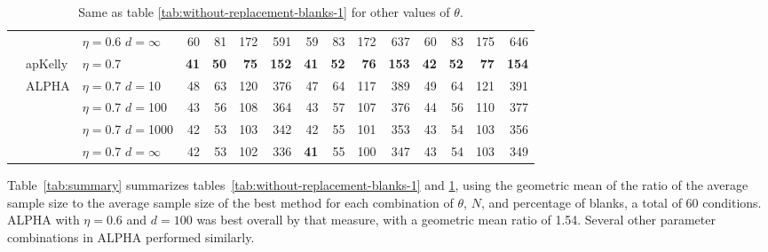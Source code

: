 \documentclass[12pt,runningheads]{llncs}
\begin{document}
{\begin{table}
\begin{tabular}{lll|rrrr|rrrr|rrrr}
 &  & $\eta=$0.6 $d=\infty$ & 60  & 81  & 172  & 591  & 59  & 83  & 172  & 637  & 60  & 83  & 175  & 646  \\
\cline{2-15} & apKelly & $\eta=$0.7 & \bf{41}  & \bf{50}  & \bf{75}  & \bf{152}  & \bf{41}  & \bf{52}  & \bf{76}  & \bf{153}  & \bf{42}  & \bf{52}  & \bf{77}  & \bf{154}  \\
\cline{2-15}
& ALPHA & $\eta=$0.7 $d=$10 & 48  & 63  & 120  & 376  & 47  & 64  & 117  & 389  & 49  & 64  & 121  & 391  \\
&  & $\eta=$0.7 $d=$100 & 43  & 56  & 108  & 364  & 43  & 57  & 107  & 376  & 44  & 56  & 110  & 377  \\
&  & $\eta=$0.7 $d=$1000 & 42  & 53  & 103  & 342  & 42  & 55  & 101  & 353  & 43  & 54  & 103  & 356  \\
&  & $\eta=$0.7 $d=\infty$ & 42  & 53  & 102  & 336  & \bf{41}  & 55  & 100  & 347  & 43  & 54  & 103  & 349 
 \end{tabular}
\caption{\protect \label{tab:without-replacement-blanks-2}
Same as table \ref{tab:without-replacement-blanks-1} for other values of $\theta$.
}
\end{table}

Table~\ref{tab:summary} summarizes tables~\ref{tab:without-replacement-blanks-1} and \ref{tab:without-replacement-blanks-2},
using the geometric mean of the ratio of the average sample size to the 
average sample size of the best method for each combination of $\theta$, $N$, and percentage of blanks, a total
of 60 conditions.
ALPHA with $\eta=0.6$ and $d=100$ was best overall by that measure, with a geometric mean ratio of 1.54.
Several other parameter combinations in ALPHA performed similarly.

}
\end{document}

